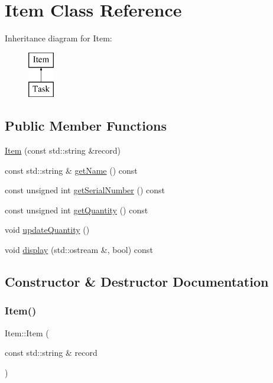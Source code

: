 \hypertarget{class_item}{}\section{Item Class Reference}
\label{class_item}
Inheritance diagram for Item\+:\begin{figure}[H]
\begin{center}
\leavevmode
\includegraphics[height=2.000000cm]{class_item}
\end{center}
\end{figure}
\subsection*{Public Member Functions}
\begin{DoxyCompactItemize}
\item 
\mbox{\hyperlink{class_item_ab7cd3059adc4e1639714eea98d0dafc6}{Item}} (const std\+::string \&record)
\item 
const std\+::string \& \mbox{\hyperlink{class_item_a906722df9ab3f424d32c4106ff64aa15}{get\+Name}} () const
\item 
const unsigned int \mbox{\hyperlink{class_item_a73bb3db4f7f0c571d6527d70875db284}{get\+Serial\+Number}} () const
\item 
const unsigned int \mbox{\hyperlink{class_item_ad4d1e93eb012fb0124fa274284fb415c}{get\+Quantity}} () const
\item 
void \mbox{\hyperlink{class_item_ae54aa11885082b7f5e37a925dace0c65}{update\+Quantity}} ()
\item 
void \mbox{\hyperlink{class_item_a41852668dc58d933f786007835dbd8b5}{display}} (std\+::ostream \&, bool) const
\end{DoxyCompactItemize}


\subsection{Constructor \& Destructor Documentation}
\mbox{\label{class_item_ab7cd3059adc4e1639714eea98d0dafc6}} 
\subsubsection{\texorpdfstring{Item()}{Item()}}
{\footnotesize\ttfamily Item\+::\+Item (\begin{DoxyParamCaption}\item[{const std\+::string \&}]{record }\end{DoxyParamCaption})}

